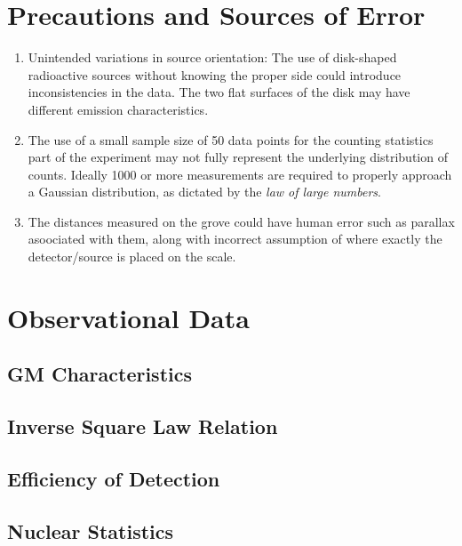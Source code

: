 \section{Precautions and Sources of Error}

\begin{enumerate}
    \item Unintended variations in source orientation:
    The use of disk-shaped radioactive sources without knowing the proper side could introduce inconsistencies in the data. The two flat surfaces of the disk may have different emission characteristics.
    \item  The use of a small sample size of 50 data points for the counting statistics part of the experiment may not fully represent the underlying distribution of counts. Ideally 1000 or more measurements are required to properly approach a Gaussian distribution, as dictated by the \textit{law of large numbers}.
    \item The distances measured on the grove could have human error such as parallax asoociated with them, along with incorrect assumption of where exactly the detector/source is placed on the scale.
\end{enumerate}
\vspace{-2em}
\appendix

\section{Observational Data}

\subsection{GM Characteristics}


\subsection{Inverse Square Law Relation}


\subsection{Efficiency of Detection}

\subsection{Nuclear Statistics}



